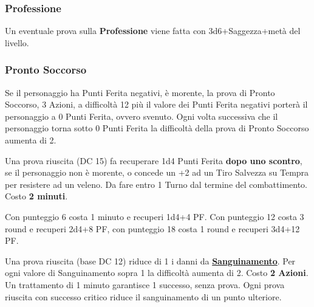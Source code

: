 \begin{multicols}{2}
\titlespacing*{\subsubsection}{0pt}{0.5em}{0.5em}\subsubsection*{Professione}
Un eventuale prova sulla \textbf{Professione} viene fatta con 3d6+Saggezza+metà del livello.


\titlespacing*{\subsubsection}{0pt}{0.5em}{0.5em}\subsubsection*{Pronto Soccorso}\hypertarget{prontosoccorso}{}\label{prontosoccorso}

Se il personaggio ha Punti Ferita negativi, è morente, la prova di Pronto Soccorso, 3 Azioni, a difficoltà 12 più il valore dei Punti Ferita negativi porterà il personaggio a 0 Punti Ferita, ovvero svenuto. Ogni volta successiva che il personaggio torna sotto 0 Punti Ferita la difficoltà della prova di Pronto Soccorso aumenta di 2.

Una prova riuscita (DC 15) fa recuperare 1d4 Punti Ferita \textbf{dopo uno scontro}, se il personaggio non è morente, o concede un +2 ad un Tiro Salvezza su Tempra per resistere ad un veleno. Da fare entro 1 Turno dal termine del combattimento. Costo \textbf{2 minuti}.

Con punteggio 6 costa 1 minuto e recuperi 1d4+4 PF. Con punteggio 12 costa 3 round e recuperi 2d4+8 PF, con punteggio 18 costa 1 round e recuperi 3d4+12 PF.

Una prova riuscita (base DC 12) riduce di 1 i danni da \hyperlink{sanguinamento}{\textbf{Sanguinamento}}. Per ogni valore di Sanguinamento sopra 1 la difficoltà aumenta di 2. Costo \textbf{2 Azioni}. Un trattamento di 1 minuto garantisce 1 successo, senza prova. Ogni prova riuscita con successo critico riduce il sanguinamento di un punto ulteriore.


\end{multicols}
